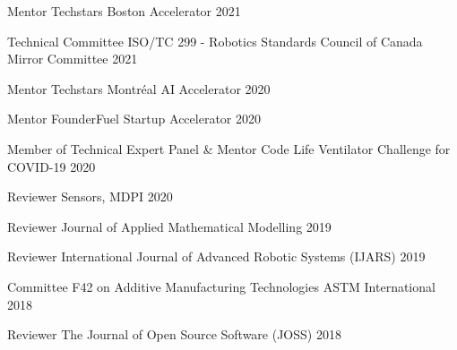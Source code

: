 \begin{cvhonors}

\cvhonor
{Mentor}
{Techstars Boston Accelerator}
{}
{2021}

\cvhonor
{Technical Committee ISO/TC 299 - Robotics}
{Standards Council of Canada Mirror Committee}
{}
{2021}

\cvhonor
{Mentor}
{Techstars Montréal AI Accelerator}
{}
{2020}

\cvhonor
{Mentor}
{FounderFuel Startup Accelerator}
{}
{2020}

\cvhonor
{Member of Technical Expert Panel \& Mentor}
{Code Life Ventilator Challenge for COVID-19}
{}
{2020}

\cvhonor
{Reviewer}
{Sensors, MDPI}
{}
{2020}

\cvhonor
{Reviewer}
{Journal of Applied Mathematical Modelling}
{}
{2019}

\cvhonor
{Reviewer}
{International Journal of Advanced Robotic Systems (IJARS)}
{}
{2019}

\cvhonor
{Committee F42 on Additive Manufacturing Technologies}
{ASTM International}
{}
{2018}

\cvhonor
{Reviewer}
{The Journal of Open Source Software (JOSS)}
{}
{2018}

\end{cvhonors}
